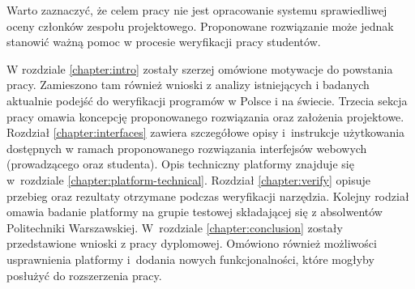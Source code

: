 Warto zaznaczyć, że celem pracy nie jest opracowanie systemu sprawiedliwej oceny członków zespołu projektowego.
Proponowane rozwiązanie może jednak stanowić ważną pomoc w procesie weryfikacji pracy studentów.

W rozdziale \ref{chapter:intro} zostały szerzej omówione motywacje do powstania pracy.
Zamieszono tam również wnioski z analizy istniejących i badanych aktualnie podejść do weryfikacji programów w Polsce i na świecie.
Trzecia sekcja pracy omawia koncepcję proponowanego rozwiązania oraz założenia projektowe.
Rozdział \ref{chapter:interfaces} zawiera szczegółowe opisy i~instrukcje użytkowania dostępnych w ramach proponowanego rozwiązania interfejsów webowych (prowadzącego oraz studenta).
Opis techniczny platformy znajduje się w~rozdziale \ref{chapter:platform-technical}.
Rozdział \ref{chapter:verify} opisuje przebieg oraz rezultaty otrzymane podczas weryfikacji narzędzia.
Kolejny rodział omawia badanie platformy na grupie testowej składającej się z absolwentów Politechniki Warszawskiej.
W~rozdziale \ref{chapter:conclusion} zostały przedstawione wnioski z pracy dyplomowej.
Omówiono również możliwości usprawnienia platformy i~dodania nowych funkcjonalności, które mogłyby posłużyć do rozszerzenia pracy.





